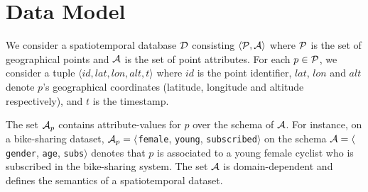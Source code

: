 \section{Data Model}\label{sec:data-model}

We consider a spatiotemporal database ${\cal D}$ consisting $\langle {\cal P}, {\cal A} \rangle$ where ${\cal P}$ is the set of
geographical points and ${\cal A}$ is the set of point attributes. For each $p \in {\cal P}$, we consider a tuple $\langle id, lat, lon, alt, t\rangle$ where $id$ is the point identifier, $lat$, $lon$ and $alt$ denote $p$'s geographical coordinates (latitude, longitude and altitude respectively), and $t$ is the timestamp.

The set ${\cal A}_p$ contains attribute-values for $p$ over the schema of ${\cal A}$. For instance, on a bike-sharing dataset, ${\cal A}_p = \langle${\tt female}, {\tt young}, {\tt subscribed}$\rangle$ on the schema ${\cal A} = \langle${\tt gender}, {\tt age}, {\tt subs}$\rangle$ denotes that $p$ is associated to a young female cyclist who is subscribed in the bike-sharing system. The set ${\cal A}$ is domain-dependent and defines the semantics of a spatiotemporal dataset. 

